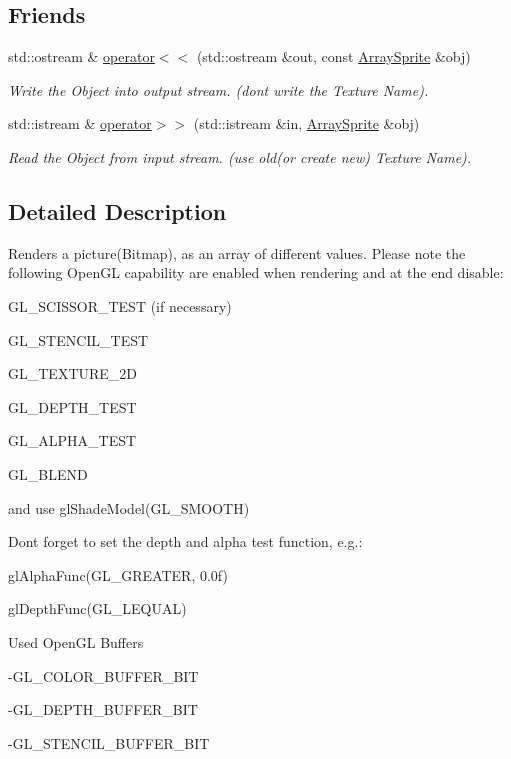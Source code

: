 \subsection*{Friends}
\begin{DoxyCompactItemize}
\item 
std::ostream \& \hyperlink{class_f2_c_1_1_array_sprite_a9d3c1de2e2f4923b597738ed1c87359b}{operator$<$$<$} (std::ostream \&out, const \hyperlink{class_f2_c_1_1_array_sprite}{ArraySprite} \&obj)
\begin{DoxyCompactList}\small\item\em Write the Object into output stream. (dont write the Texture Name). \item\end{DoxyCompactList}\item 
std::istream \& \hyperlink{class_f2_c_1_1_array_sprite_acc43469ad9fd0d0e2e47ea2155109ffb}{operator$>$$>$} (std::istream \&in, \hyperlink{class_f2_c_1_1_array_sprite}{ArraySprite} \&obj)
\begin{DoxyCompactList}\small\item\em Read the Object from input stream. (use old(or create new) Texture Name). \item\end{DoxyCompactList}\end{DoxyCompactItemize}


\subsection{Detailed Description}
Renders a picture(Bitmap), as an array of different values. Please note the following OpenGL capability are enabled when rendering and at the end disable: \par
 GL\_\-SCISSOR\_\-TEST (if necessary) \par
 GL\_\-STENCIL\_\-TEST \par
 GL\_\-TEXTURE\_\-2D \par
 GL\_\-DEPTH\_\-TEST \par
 GL\_\-ALPHA\_\-TEST \par
 GL\_\-BLEND \par
 and use glShadeModel(GL\_\-SMOOTH) \par
 \par
 Dont forget to set the depth and alpha test function, e.g.: \par
 glAlphaFunc(GL\_\-GREATER, 0.0f) \par
 glDepthFunc(GL\_\-LEQUAL) \par
 \par
 Used OpenGL Buffers \par
 -\/GL\_\-COLOR\_\-BUFFER\_\-BIT \par
 -\/GL\_\-DEPTH\_\-BUFFER\_\-BIT \par
 -\/GL\_\-STENCIL\_\-BUFFER\_\-BIT \par
 

